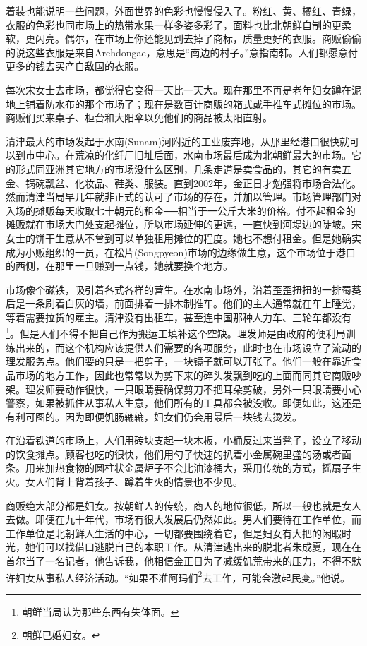 着装也能说明一些问题，外面世界的色彩也慢慢侵入了。粉红、黄、橘红、青绿，衣服的色彩也同市场上的热带水果一样多姿多彩了，面料也比北朝鲜自制的更柔软，更闪亮。偶尔，在市场上你还能见到去掉了商标，质量更好的衣服。商贩偷偷的说这些衣服是来自Arehdongae，意思是“南边的村子。”意指南韩。人们都愿意付更多的钱去买产自敌国的衣服。

每次宋女士去市场，都觉得它变得一天比一天大。现在那里不再是老年妇女蹲在泥地上铺着防水布的那个市场了；现在是数百计商贩的箱式或手推车式摊位的市场。商贩们买来桌子、柜台和大阳伞以免他们的商品被太阳直射。

清津最大的市场发起于水南(Sunam)河附近的工业废弃地，从那里经港口很快就可以到市中心。在荒凉的化纤厂旧址后面，水南市场最后成为北朝鲜最大的市场。它的形式同亚洲其它地方的市场没什么区别，几条走道是卖食品的，其它的有卖五金、锅碗瓢盆、化妆品、鞋类、服装。直到2002年，金正日才勉强将市场合法化。然而清津当局早几年就非正式的认可了市场的存在，并加以管理。市场管理部门对入场的摊贩每天收取七十朝元的租金──相当于一公斤大米的价格。付不起租金的摊贩就在市场大门处支起摊位，所以市场延伸的更远，一直快到河堤边的陡坡。宋女士的饼干生意从不曾到可以单独租用摊位的程度。她也不想付租金。但是她确实成为小贩组织的一员，在松片(Songpyeon)市场的边缘做生意，这个市场位于港口的西侧，在那里一旦赚到一点钱，她就要换个地方。

市场像个磁铁，吸引着各式各样的营生。在水南市场外，沿着歪歪扭扭的一排蜀葵后是一条刷着白灰的墙，前面排着一排木制推车。他们的主人通常就在车上睡觉，等着需要拉货的雇主。清津没有出租车，甚至连中国那种人力车、三轮车都没有\footnote{朝鲜当局认为那些东西有失体面。}。但是人们不得不把自己作为搬运工填补这个空缺。理发师是由政府的便利局训练出来的，而这个机构应该提供人们需要的各项服务，此时也在市场设立了流动的理发服务点。他们要的只是一把剪子，一块镜子就可以开张了。他们一般在靠近食品市场的地方工作，因此也常常以为剪下来的碎头发飘到吃的上面而同其它商贩吵架。理发师要动作很快，一只眼睛要确保剪刀不把耳朵剪破，另外一只眼睛要小心警察，如果被抓住从事私人生意，他们所有的工具都会被没收。即便如此，这还是有利可图的。因为即便饥肠辘辘，妇女们仍会用最后一块钱去烫发。

在沿着铁道的市场上，人们用砖块支起一块木板，小桶反过来当凳子，设立了移动的饮食摊点。顾客也吃的很快，他们用勺子快速的扒着小金属碗里盛的汤或者面条。用来加热食物的圆柱状金属炉子不会比油漆桶大，采用传统的方式，摇扇子生火。女人们背上背着孩子、蹲着生火的情景也不少见。

商贩绝大部分都是妇女。按朝鲜人的传统，商人的地位很低，所以一般也就是女人去做。即便在九十年代，市场有很大发展后仍然如此。男人们要待在工作单位，而工作单位是北朝鲜人生活的中心，一切都要围绕着它，但是妇女有大把的闲暇时光，她们可以找借口逃脱自己的本职工作。从清津逃出来的脱北者朱成夏，现在在首尔当了一名记者，他告诉我，他相信金正日为了减缓饥荒带来的压力，不得不默许妇女从事私人经济活动。“如果不准阿玛们\footnote{朝鲜已婚妇女。}去工作，可能会激起民变。”他说。

